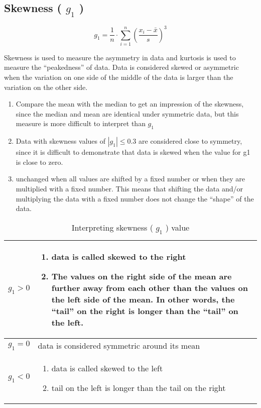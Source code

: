 \subsection{Skewness ( $g_1$ ) \cite{ism-1}}\label{Skewness}
\[
    g_1 = \displaystyle\dfrac{1}{n} \cdot \sum_{i=1}^{n} \left( \dfrac{x_i - \bar{x}}{s} \right)^3
\]

Skewness is used to measure the asymmetry in data and kurtosis is used to measure the “peakedness” of data. Data is considered skewed or asymmetric when the variation on one side of the middle of the data is larger than the variation on the other side.

\begin{enumerate}
    \item Compare the mean with the median to get an impression of the skewness, since the median and mean are identical under symmetric data, but this measure is more difficult to interpret than $g_1$
    \item Data with skewness values of $|g_1| \leq 0.3$ are considered close to symmetry, since it is difficult to demonstrate that data is skewed when the value for g1 is close to zero.
    \item unchanged when all values are shifted by a fixed number or when they are multiplied with a fixed number. This means that shifting the data and/or multiplying the data with a fixed number does not change the “shape” of the data.
\end{enumerate}

\begin{table}
    \centering
    \begin{tabular}{|c|m{13cm}|}
        \hline
        $g_1 > 0$ & \vspace{0.5cm}\begin{enumerate}
            \item data is called skewed to the right
            \item The values on the right side of the mean are further away from each other than the values on the left side of the mean. In other words, the “tail” on the right is longer than the “tail” on the left.
        \end{enumerate}\vspace{-0.5cm} \\ \hline
        $g_1 = 0$ & data is considered symmetric around its mean \\ \hline
        $g_1 < 0$ & \vspace{0.5cm} \begin{enumerate}
            \item data is called skewed to the left
            \item tail on the left is longer than the tail on the right
        \end{enumerate} \vspace{-1cm} \\ \hline
    \end{tabular}
    \caption{Interpreting skewness ( $g_1$ ) value}
\end{table}

